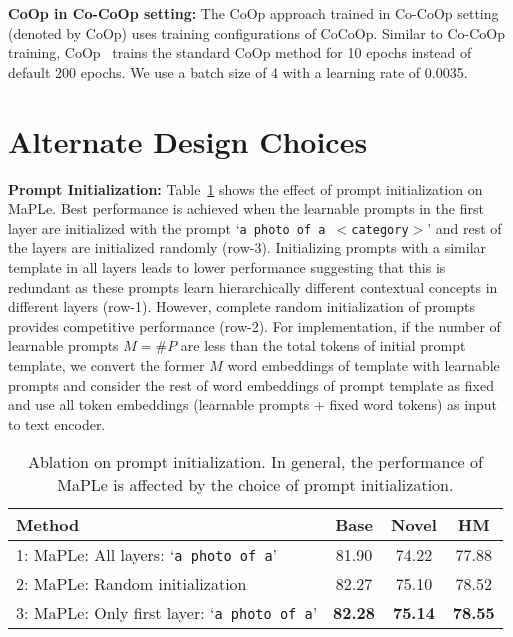 \documentclass[10pt,twocolumn,letterpaper]{article}
\newcommand{\tablestyle}[2]{\setlength{\tabcolsep}{#1}\renewcommand{\arraystretch}{#2}\centering\footnotesize}
\newcommand{\txt}[1]{{\texttt{#1}}}
\begin{document}
\noindent \textbf{CoOp in Co-CoOp setting:} The CoOp approach trained in Co-CoOp setting (denoted by CoOp\dag) uses training configurations of CoCoOp. Similar to Co-CoOp training, CoOp\dag~ trains the standard CoOp method for 10 epochs instead of default 200 epochs. We use a batch size of 4 with a learning rate of 0.0035.

\section{Alternate Design Choices}
\label{appendix:alternate_design_choices}

\noindent \textbf{Prompt Initialization:} 
 Table~\ref{table:prompt_initialization} shows the effect of prompt initialization on MaPLe. Best performance is achieved when the learnable prompts in the first layer are initialized with the prompt `\txt{a photo of a $<$category$>$}' and rest of the layers are initialized randomly (row-3). Initializing prompts with a similar template in all layers leads to lower performance suggesting that 
this is redundant as these prompts learn hierarchically different contextual concepts in different layers (row-1). However, complete random initialization of prompts provides competitive performance (row-2). For implementation, if the number of learnable prompts $M=\#P$ are less than the total tokens of initial prompt template, we convert the former $M$ word embeddings of template with learnable prompts and consider the rest of word embeddings of prompt template as fixed and use all token embeddings (learnable prompts + fixed word tokens) as input to text encoder.

\begin{table}[h!]
\centering
    \tablestyle{6pt}{1.1}
\addtolength{\tabcolsep}{-4.5pt}
\begin{tabular}{l ccc}
\toprule
Method  & Base & Novel & HM\\
\midrule
1: MaPLe: All layers: `\txt{a photo of a}' & 81.90 & 74.22 &	77.88\\
2: MaPLe: Random initialization  & 82.27 &	75.10 &	78.52\\
3: MaPLe: Only first layer: `\txt{a photo of a}' & \textbf{82.28} &	\textbf{75.14} &	\textbf{78.55}\\
\bottomrule
\end{tabular}
\caption{
{Ablation on prompt initialization.} In general, the performance of MaPLe is affected by the choice of prompt initialization.
} 
\label{table:prompt_initialization}
\end{table}
\end{document}
